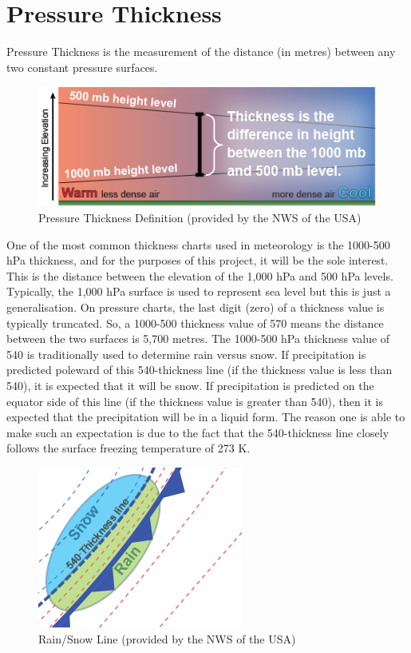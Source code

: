 \section{Pressure Thickness}\label{pressure_thickness}
\begin{definition}
Pressure Thickness is the measurement of the distance (in metres) between any two constant pressure surfaces.
\end{definition}

\begin{figure}[H]
    \centering
    \includegraphics[width=.8\linewidth]{Images/thickness_def.png}
    \caption{Pressure Thickness Definition (provided by the NWS of the USA)}
    \label{thickness_def}
\end{figure}

One of the most common thickness charts used in meteorology is the 1000-500 hPa thickness, and for the purposes of this project, it will be the sole interest. This is the distance between the elevation of the 1,000 hPa and 500 hPa levels. Typically, the 1,000 hPa surface is used to represent sea level but this is just a generalisation. On pressure charts, the last digit (zero) of a thickness value is typically truncated. So, a 1000-500 thickness value of 570 means the distance between the two surfaces is 5,700 metres. The 1000-500 hPa thickness value of 540 is traditionally used to determine rain versus snow. If precipitation is predicted poleward of this 540-thickness line (if the thickness value is less than 540), it is expected that it will be snow. If precipitation is predicted on the equator side of this line (if the thickness value is greater than 540), then it is expected that the precipitation will be in a liquid form. The reason one is able to make such an expectation is due to the fact that the 540-thickness line closely follows the surface freezing temperature of 273 K\cite{thickness}.

\begin{figure}[H]
    \centering
    \includegraphics[width=.4\linewidth]{Images/rainsnow_line.png}
    \caption{Rain/Snow Line (provided by the NWS of the USA)}
    \label{rainsnow_line}
\end{figure}

